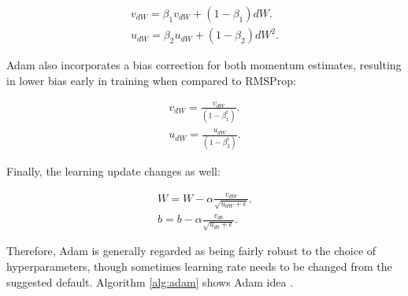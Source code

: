 \begin{align}\label{eq:adam_1}
v_{dW} = \beta_{1} v_{dW} + (1 - \beta_{1})dW.\\
u_{dW} = \beta_{2} u_{dW} + (1 - \beta_{2})dW^2.
\label{eq:adam_2}
\end{align}

Adam also incorporates a bias correction for both momentum estimates, resulting in lower bias early in training when compared to RMSProp:

\begin{align}
v_{dW} = \frac{v_{dW}}{(1 - \beta_{1}^{t})}.\\
u_{dW} = \frac{u_{dW}}{(1 - \beta_{2}^{t})}.
\end{align}

Finally, the learning update changes as well:

\begin{align}
W = W - \alpha  \frac{v_{dW}}{\sqrt{u_{dW} + \epsilon}}. \\
b = b - \alpha \frac{v_{db}}{\sqrt{u_{db} + \epsilon}}.
\end{align}

Therefore, Adam is generally regarded as being fairly robust to the choice of hyperparameters, though sometimes learning rate needs to be changed from the suggested default.  Algorithm \ref{alg:adam} shows Adam idea \cite{Goodfellow-et-al-2016}.


